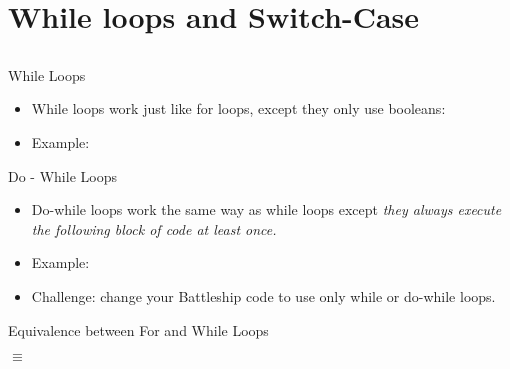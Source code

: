 \section{While loops and Switch-Case}
\subsection{}
\begin{frame}[fragile]{While Loops}
\begin{itemize}
\item While loops work just like for loops, except they only use booleans:
\begin{center}\texttt{}\end{center}
\item Example:
\begin{semiverbatim}\end{semiverbatim}

\end{itemize}
\end{frame}

\begin{frame}[fragile]{Do - While Loops}
\begin{itemize}
\item Do-while loops work the same way as while loops except \emph{they always execute the following block of code at least once.}
\item Example:
\begin{semiverbatim}\end{semiverbatim}
\item Challenge: change your Battleship code to use only while or do-while loops.
\end{itemize}

\end{frame}

\begin{frame}[fragile]{Equivalence between For and While Loops}

\begin{semiverbatim}\end{semiverbatim}

\begin{center}$\equiv$\end{center}
\begin{semiverbatim}\end{semiverbatim}

\end{frame}

